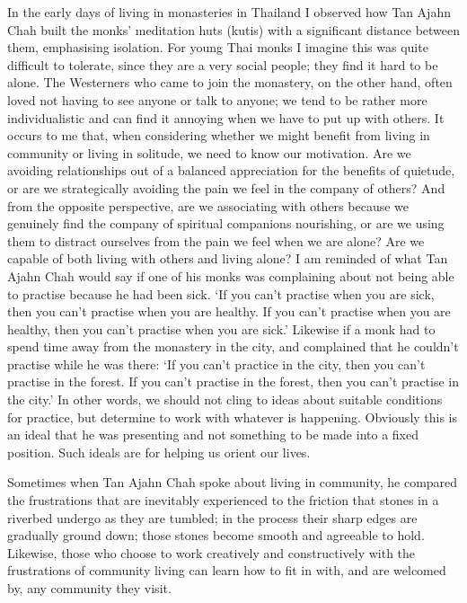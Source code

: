 In the early days of living in monasteries in Thailand I observed how
Tan Ajahn Chah built the monks' meditation huts (kutis) with a
significant distance between them, emphasising isolation. For young Thai
monks I imagine this was quite difficult to tolerate, since they are a
very social people; they find it hard to be alone. The Westerners who
came to join the monastery, on the other hand, often loved not having to
see anyone or talk to anyone; we tend to be rather more individualistic
and can find it annoying when we have to put up with others. It occurs
to me that, when considering whether we might benefit from living in
community or living in solitude, we need to know our motivation. Are we
avoiding relationships out of a balanced appreciation for the benefits
of quietude, or are we strategically avoiding the pain we feel in the
company of others? And from the opposite perspective, are we associating
with others because we genuinely find the company of spiritual
companions nourishing, or are we using them to distract ourselves from
the pain we feel when we are alone? Are we capable of both living with
others and living alone? I am reminded of what Tan Ajahn Chah would say
if one of his monks was complaining about not being able to practise
because he had been sick. `If you can't practise when you are sick, then
you can't practise when you are healthy. If you can't practise when you
are healthy, then you can't practise when you are sick.' Likewise if a
monk had to spend time away from the monastery in the city, and
complained that he couldn't practise while he was there: `If you can't
practice in the city, then you can't practise in the forest. If you
can't practise in the forest, then you can't practise in the city.' In
other words, we should not cling to ideas about suitable conditions for
practice, but determine to work with whatever is happening. Obviously
this is an ideal that he was presenting and not something to be made
into a fixed position. Such ideals are for helping us orient our lives.

Sometimes when Tan Ajahn Chah spoke about living in community, he
compared the frustrations that are inevitably experienced to the
friction that stones in a riverbed undergo as they are tumbled; in the
process their sharp edges are gradually ground down; those stones become
smooth and agreeable to hold. Likewise, those who choose to work
creatively and constructively with the frustrations of community living
can learn how to fit in with, and are welcomed by, any community they
visit.

